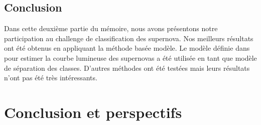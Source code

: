 \documentclass[french]{report}
\begin{document}
\section*{Conclusion}
Dans cette deuxième partie du mémoire, nous avons présentons notre participation au challenge de classification des supernova. Nos meilleurs résultats ont été obtenus en appliquant la méthode basée modèle. Le modèle définie dans \cite{bazin} pour estimer la courbe lumineuse des supernovas a été utilisée en tant que modèle de séparation des classes. D'autres méthodes ont été testées mais leurs résultats n'ont pas été très intéressants.
%
%
%
%
%



\chapter*{Conclusion et perspectifs}



\end{document}
